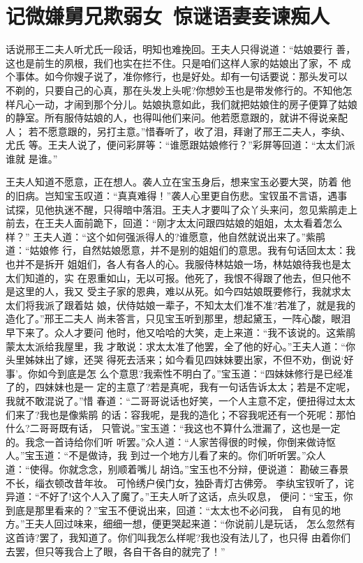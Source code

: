 \chapter{记微嫌舅兄欺弱女~惊谜语妻妾谏痴人}

话说邢王二夫人听尤氏一段话，明知也难挽回。王夫人只得说道：“姑娘要行
善，这也是前生的夙根，我们也实在拦不住。只是咱们这样人家的姑娘出了家，不
成个事体。如今你嫂子说了，准你修行，也是好处。却有一句话要说：那头发可以
不剃的，只要自己的心真，那在头发上头呢?你想妙玉也是带发修行的。不知他怎
样凡心一动，才闹到那个分儿。姑娘执意如此，我们就把姑娘住的房子便算了姑娘
的静室。所有服侍姑娘的人，也得叫他们来问。他若愿意跟的，就讲不得说亲配人；
若不愿意跟的，另打主意。”惜春听了，收了泪，拜谢了邢王二夫人，李纨、尤氏
等。王夫人说了，便问彩屏等：“谁愿跟姑娘修行？”彩屏等回道：“太太们派谁就
是谁。”

王夫人知道不愿意，正在想人。袭人立在宝玉身后，想来宝玉必要大哭，防着
他的旧病。岂知宝玉叹道：“真真难得！”袭人心里更自伤悲。宝钗虽不言语，遇事
试探，见他执迷不醒，只得暗中落泪。王夫人才要叫了众丫头来问，忽见紫鹃走上
前去，在王夫人面前跪下，回道：“刚才太太问跟四姑娘的姐姐，太太看着怎么样？”
王夫人道：“这个如何强派得人的?谁愿意，他自然就说出来了。”紫鹃道：“姑娘修
行，自然姑娘愿意，并不是别的姐姐们的意思。我有句话回太太：我也并不是拆开
姐姐们，各人有各人的心。我服侍林姑娘一场，林姑娘待我也是太太们知道的，实
在恩重如山，无以可报。他死了，我恨不得跟了他去，但只他不是这里的人，我又
受主子家的恩典，难以从死。如今四姑娘既要修行，我就求太太们将我派了跟着姑
娘，伏侍姑娘一辈子，不知太太们准不准?若准了，就是我的造化了。”邢王二夫人
尚未答言，只见宝玉听到那里，想起黛玉，一阵心酸，眼泪早下来了。众人才要问
他时，他又哈哈的大笑，走上来道：“我不该说的。这紫鹃蒙太太派给我屋里，我
才敢说：求太太准了他罢，全了他的好心。”王夫人道：“你头里姊妹出了嫁，还哭
得死去活来；如今看见四妹妹要出家，不但不劝，倒说‘好事’。你如今到底是怎
么个意思?我索性不明白了。”宝玉道：“四妹妹修行是已经准了的，四妹妹也是一
定的主意了?若是真呢，我有一句话告诉太太；若是不定呢，我就不敢混说了。”惜
春道：“二哥哥说话也好笑，一个人主意不定，便扭得过太太们来了?我也是像紫鹃
的话：容我呢，是我的造化；不容我呢还有一个死呢：那怕什么?二哥哥既有话，
只管说。”宝玉道：“我这也不算什么泄漏了，这也是一定的。我念一首诗给你们听
听罢。”众人道：“人家苦得很的时候，你倒来做诗怄人。”宝玉道：“不是做诗，我
到过一个地方儿看了来的。你们听听罢。”众人道：“使得。你就念念，别顺着嘴儿
胡诌。”宝玉也不分辩，便说道：
勘破三春景不长，缁衣顿改昔年妆。
可怜绣户侯门女，独卧青灯古佛旁。
李纨宝钗听了，诧异道：“不好了!这个人入了魔了。”王夫人听了这话，点头叹息，
便问：“宝玉，你到底是那里看来的？”宝玉不便说出来，回道：“太太也不必问我，
自有见的地方。”王夫人回过味来，细细一想，便更哭起来道：“你说前儿是玩话，
怎么忽然有这首诗?罢了，我知道了。你们叫我怎么样呢?我也没有法儿了，也只得
由着你们去罢，但只等我合上了眼，各自干各自的就完了！”

